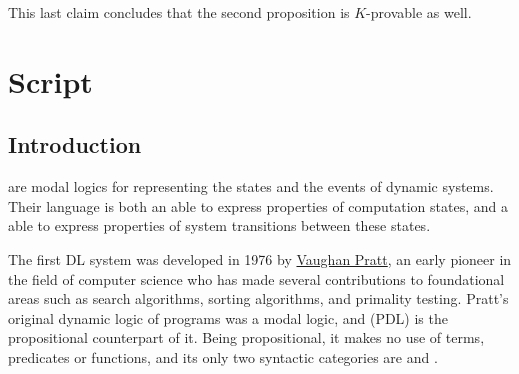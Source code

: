 \documentclass[a4paper, 12pt]{report}
\begin{document}
{        

        This last claim concludes that the second proposition is $K$-provable as well.
    }

    \chapter{Script}

    \section{Introduction}

     are modal logics for representing the states and the events of dynamic systems. Their language is both an  able to express properties of computation states, and a  able to express properties of system transitions between these states.

    The first DL system was developed in 1976 by \href{https://en.wikipedia.org/wiki/Vaughan_Pratt}{Vaughan Pratt}, an early pioneer in the field of computer science who has made several contributions to foundational areas such as search algorithms, sorting algorithms, and primality testing. Pratt's original dynamic logic of programs was a  modal logic, and  (PDL) is the propositional counterpart of it. Being propositional, it makes no use of terms, predicates or functions, and its only two syntactic categories are  and .
\end{document}
